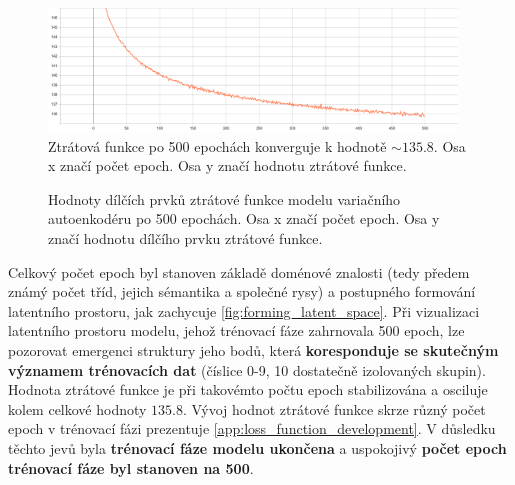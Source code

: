 \begin{figure}[H]
    \centering
    \includegraphics[width=0.97\textwidth]{figures/vae_model_total_loss_500_epochs.pdf}
    \caption{Ztrátová funkce po 500 epochách konverguje k hodnotě $\sim 135.8$. Osa x značí počet epoch. Osa y značí hodnotu ztrátové funkce.}
    \label{fig:vae_model_loss_function_converence}
\end{figure}

\begin{figure}[H]
    \centering
    \qquad
    \caption{Hodnoty dílčích prvků ztrátové funkce modelu variačního autoenkodéru po 500 epochách. Osa x značí počet epoch. Osa y značí hodnotu dílčího prvku ztrátové funkce.}
    \label{fig:vae_model_loss_function_terms_converence}
\end{figure}

Celkový počet epoch byl stanoven základě doménové znalosti (tedy předem známý počet tříd, jejich sémantika a společné rysy) a postupného formování latentního prostoru, jak zachycuje \autoref{fig:forming_latent_space}.
Při vizualizaci latentního prostoru modelu, jehož trénovací fáze zahrnovala 500 epoch, lze pozorovat emergenci struktury jeho bodů, která \textbf{koresponduje se skutečným významem trénovacích dat} (číslice 0-9, 10 dostatečně izolovaných skupin).
Hodnota ztrátové funkce je při takovémto počtu epoch stabilizována a osciluje kolem celkové hodnoty $135.8$. Vývoj hodnot ztrátové funkce skrze různý počet epoch v trénovací fázi prezentuje \autoref{app:loss_function_development}.
V důsledku těchto jevů byla \textbf{trénovací fáze modelu ukončena} a uspokojivý \textbf{počet epoch trénovací fáze byl stanoven na 500}.

